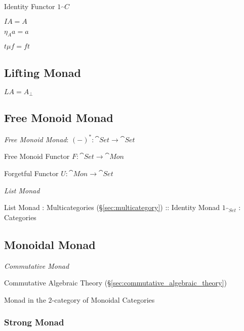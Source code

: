 Identity Functor $1_\cat{C}$

$I A = A$

$\eta_A a = a$

$t \mu f = f t$



\subsection{Lifting Monad}\label{sec:lifting_monad}

$L A = A_\bot$




\subsection{Free Monoid Monad}\label{sec:free_monoid_monad}

\emph{Free Monoid Monad}: $(-)^* : \cat{Set} \rightarrow \cat{Set}$

Free Monoid Functor $F : \cat{Set} \rightarrow \cat{Mon}$

Forgetful Functor $U : \cat{Mon} \rightarrow \cat{Set}$

\emph{List Monad}

List Monad : Multicategories (\S\ref{sec:multicategory}) :: Identity
Monad $1_{\cat{Set}}$ : Categories



\subsection{Monoidal Monad}\label{sec:monoidal_monad}

\emph{Commutative Monad}

Commutative Algebraic Theory
(\S\ref{sec:commutative_algebraic_theory})

Monad in the $2$-category of Monoidal Categories




\subsubsection{Strong Monad}\label{sec:strong_monad}

